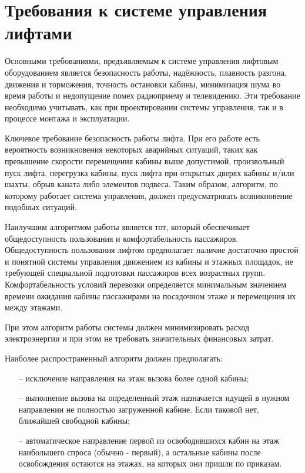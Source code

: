 \section{Требования к системе управления лифтами}

	Основными требованиями, предъявляемым к системе управления лифтовым оборудованием является безопасность работы,
		надёжность, плавность разгона, движения и торможения,
		точность остановки кабины, минимизация шума во время работы и недопущение помех
		радиоприему и телевидению. Эти требование необходимо учитывать,
		как при проектировании системы управления, так и в процессе монтажа и эксплуатации.
		
	Ключевое требование безопасность работы лифта. При его работе есть вероятность возникновения некоторых аварийных ситуаций, таких как превышение скорости перемещения кабины выше допустимой, произвольный пуск лифта, перегрузка кабины, пуск лифта при открытых дверях кабины и/или шахты, обрыв каната либо элементов подвеса. Таким образом, алгоритм, по которому работает система управления, должен предусматривать возникновение подобных ситуаций.
	
	Наилучшим алгоритмом работы является тот, который обеспечивает общедоступность пользования и комфортабельность пассажиров. Общедоступность пользования лифтом предполагает наличие достаточно простой и понятной системы управления движением из кабины и этажных площадок, не требующей специальной подготовки пассажиров всех возрастных групп. Комфортабельность условий перевозки определяется минимальным значением времени ожидания кабины пассажирами на посадочном этаже и перемещения их между этажами.

	При этом алгоритм работы системы должен минимизировать расход электроэнергии и при этом не требовать значительных финансовых затрат.

	Наиболее распространенный алгоритм должен предполагать:
		\begin{itemize}
			\item[--] исключение направления на этаж вызова более одной кабины;
			\item[--] выполнение вызова на определенный этаж назначается идущей в нужном направлении не полностью загруженной кабине. Если таковой нет, ближайшей свободной кабины;
			\item[--] автоматическое направление первой из освободившихся кабин на этаж наибольшего спроса (обычно - первый), а остальные кабины после освобождения остаются на этажах, на которых они пришли по приказам.
		\end{itemize}
	
